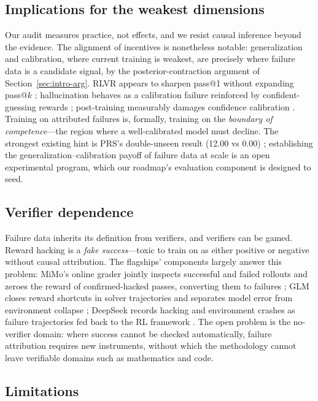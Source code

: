 \documentclass[10pt]{article}
\begin{document}
\subsection{Implications for the weakest dimensions}

Our audit measures practice, not effects, and we resist causal inference beyond the evidence. The alignment of incentives is nonetheless notable: generalization and calibration, where current training is weakest, are precisely where failure data is a candidate signal, by the posterior-contraction argument of Section~\ref{sec:intro-arg}. RLVR appears to sharpen pass@1 without expanding pass@$k$ \cite{yue2025rlvr}; hallucination behaves as a calibration failure reinforced by confident-guessing rewards \cite{kalai2025halluc}; post-training measurably damages confidence calibration \cite{he2023calibration,xie2026know}. Training on attributed failures is, formally, training on the \emph{boundary of competence}---the region where a well-calibrated model must decline. The strongest existing hint is PRS's double-unseen result (12.00 vs 0.00) \cite{hao2026prs}; establishing the generalization--calibration payoff of failure data at scale is an open experimental program, which our roadmap's evaluation component is designed to seed.

\subsection{Verifier dependence}\label{sec:verifier}

Failure data inherits its definition from verifiers, and verifiers can be gamed. Reward hacking is a \emph{fake success}---toxic to train on as either positive or negative without causal attribution. The flagships' components largely answer this problem: MiMo's online grader jointly inspects successful and failed rollouts and zeroes the reward of confirmed-hacked passes, converting them to failures \cite{xiaomi2026mimo}; GLM closes reward shortcuts in solver trajectories and separates model error from environment collapse \cite{zai2026glm5}; DeepSeek records hacking and environment crashes as failure trajectories fed back to the RL framework \cite{deepseek2026v41}. The open problem is the no-verifier domain: where success cannot be checked automatically, failure attribution requires new instruments, without which the methodology cannot leave verifiable domains such as mathematics and code.

\subsection{Limitations}\label{sec:limitations}
\end{document}
